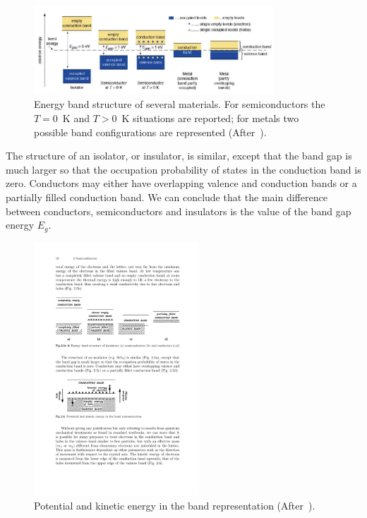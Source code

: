  \begin{figure}[htbp]
   \centering
   \includegraphics[width=0.8\textwidth]{EnergyBandGap.png} %
   \caption{\label{fig:EnergyBandGap}Energy band structure of several materials. For 
   semiconductors the  $T=0$~K and $T>0$~K situations are reported; for metals two 
   possible band configurations are represented (After~\cite{Krammer}).}
\end{figure}


 The structure of an isolator, or insulator, is similar,  except that the band gap is much larger so that 
 the occupation probability of states in the conduction band is zero.   Conductors may either have 
 overlapping valence and conduction bands  or a partially filled conduction band. 
 We can conclude that the main difference between conductors, semiconductors and insulators 
 is the value of the band gap energy $E_g$.
 
 \begin{figure}[htbp]
   \centering
   \includegraphics[width=0.55\textwidth]{KinEnergy.pdf} %
   \caption{\label{fig:KinEnergy}Potential and kinetic energy in the band 
   representation (After~\cite{Lutz:411172}).}
\end{figure}

